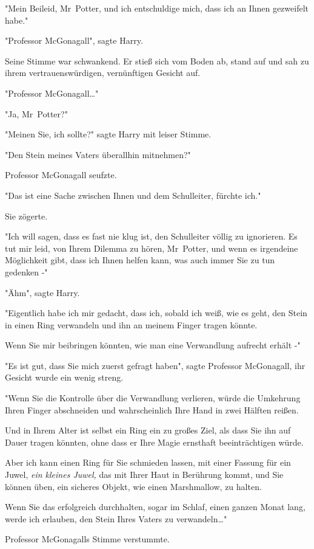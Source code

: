 {"Mein Beileid, Mr~Potter, und ich entschuldige mich, dass ich an Ihnen gezweifelt habe."

"Professor McGonagall", sagte Harry.

Seine Stimme war schwankend. Er stieß sich vom Boden ab, stand auf und sah zu ihrem vertrauenswürdigen, vernünftigen Gesicht auf.

"Professor McGonagall…"

"Ja, Mr~Potter?"

"Meinen Sie, ich sollte?" sagte Harry mit leiser Stimme.

"Den Stein meines Vaters überallhin mitnehmen?"

Professor McGonagall seufzte.

"Das ist eine Sache zwischen Ihnen und dem Schulleiter, fürchte ich."

Sie zögerte.

"Ich will sagen, dass es fast nie klug ist, den Schulleiter völlig zu ignorieren. Es tut mir leid, von Ihrem Dilemma zu hören, Mr~Potter, und wenn es irgendeine Möglichkeit gibt, dass ich Ihnen helfen kann, was auch immer Sie zu tun gedenken -"

"Ähm", sagte Harry.

"Eigentlich habe ich mir gedacht, dass ich, sobald ich weiß, wie es geht, den Stein in einen Ring verwandeln und ihn an meinem Finger tragen könnte.

Wenn Sie mir beibringen könnten, wie man eine Verwandlung aufrecht erhält -"

"Es ist gut, dass Sie mich zuerst gefragt haben", sagte Professor McGonagall, ihr Gesicht wurde ein wenig streng.

"Wenn Sie die Kontrolle über die Verwandlung verlieren, würde die Umkehrung Ihren Finger abschneiden und wahrscheinlich Ihre Hand in zwei Hälften reißen.

Und in Ihrem Alter ist selbst ein Ring ein zu großes Ziel, als dass Sie ihn auf Dauer tragen könnten, ohne dass er Ihre Magie ernsthaft beeinträchtigen würde.

Aber ich kann einen Ring für Sie schmieden lassen, mit einer Fassung für ein Juwel, \emph{ein kleines Juwel,} das mit Ihrer Haut in Berührung kommt, und Sie können üben, ein sicheres Objekt, wie einen Marshmallow, zu halten.

Wenn Sie das erfolgreich durchhalten, sogar im Schlaf, einen ganzen Monat lang, werde ich erlauben, den Stein Ihres Vaters zu verwandeln…"

Professor McGonagalls Stimme verstummte.

}

